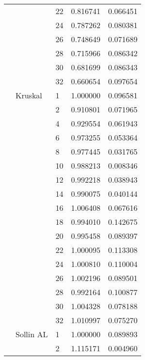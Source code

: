 \begin{tabular}{lllrr}
                      &            & 22 &  0.816741 &  0.066451 \\
                      &            & 24 &  0.787262 &  0.080381 \\
                      &            & 26 &  0.748649 &  0.071689 \\
                      &            & 28 &  0.715966 &  0.086342 \\
                      &            & 30 &  0.681699 &  0.086343 \\
                      &            & 32 &  0.660654 &  0.097654 \\
                      & Kruskal & 1  &  1.000000 &  0.096581 \\
                      &            & 2  &  0.910801 &  0.071965 \\
                      &            & 4  &  0.929554 &  0.061943 \\
                      &            & 6  &  0.973255 &  0.053364 \\
                      &            & 8  &  0.977445 &  0.031765 \\
                      &            & 10 &  0.988213 &  0.008346 \\
                      &            & 12 &  0.992218 &  0.038943 \\
                      &            & 14 &  0.990075 &  0.040144 \\
                      &            & 16 &  1.006408 &  0.067616 \\
                      &            & 18 &  0.994010 &  0.142675 \\
                      &            & 20 &  0.995458 &  0.089397 \\
                      &            & 22 &  1.000095 &  0.113308 \\
                      &            & 24 &  1.000810 &  0.110004 \\
                      &            & 26 &  1.002196 &  0.089501 \\
                      &            & 28 &  0.992164 &  0.100877 \\
                      &            & 30 &  1.004328 &  0.078188 \\
                      &            & 32 &  1.010997 &  0.075270 \\
                      & Sollin AL & 1  &  1.000000 &  0.089893 \\
                      &            & 2  &  1.115171 &  0.004960 \\

\end{tabular}
